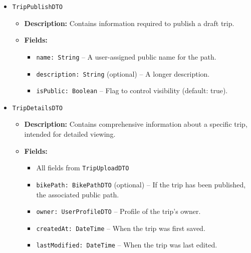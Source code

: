 \begin{itemize}
    \item \texttt{TripPublishDTO}
    \begin{itemize}
        \item \textbf{Description:} Contains information required to publish a draft trip.
        \item \textbf{Fields:}
        \begin{itemize}
            \item \texttt{name: String} – A user-assigned public name for the path.
            \item \texttt{description: String} (optional) – A longer description.
            \item \texttt{isPublic: Boolean} – Flag to control visibility (default: true).
        \end{itemize}
    \end{itemize}

    \item \texttt{TripDetailsDTO}
    \begin{itemize}
        \item \textbf{Description:} Contains comprehensive information about a specific trip, intended for detailed viewing.
        \item \textbf{Fields:}
        \begin{itemize}
            \item All fields from \texttt{TripUploadDTO}
            \item \texttt{bikePath: BikePathDTO} (optional) – If the trip has been published, the associated public path.
            \item \texttt{owner: UserProfileDTO} – Profile of the trip's owner.
            \item \texttt{createdAt: DateTime} – When the trip was first saved.
            \item \texttt{lastModified: DateTime} – When the trip was last edited.
        \end{itemize}
    \end{itemize}


\end{itemize}
